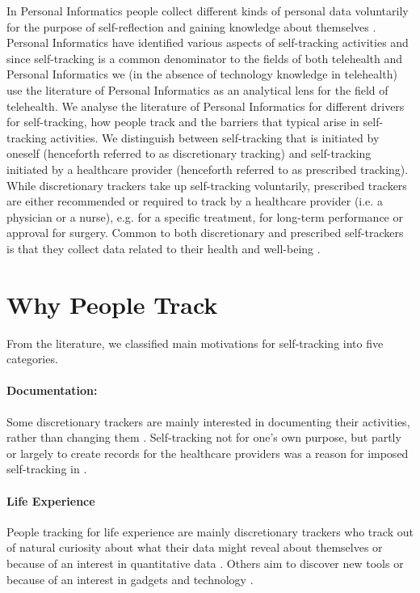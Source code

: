 In Personal Informatics people collect different kinds of personal data voluntarily for the purpose of self-reflection and gaining knowledge about themselves \cite{Li2010}.  Personal Informatics have identified various aspects of self-tracking activities \cite{Li2010} and since self-tracking is a common denominator to the fields of both telehealth and Personal Informatics we (in the absence of technology knowledge in telehealth) use the literature of Personal Informatics as an analytical lens for the field of telehealth. We analyse the literature of Personal Informatics for different drivers for self-tracking, how people track and the barriers that typical arise in self-tracking activities. We distinguish between self-tracking that is initiated by oneself (henceforth referred to as discretionary tracking) and self-tracking initiated by a healthcare provider (henceforth referred to as prescribed tracking). While discretionary trackers take up self-tracking voluntarily, prescribed trackers are either recommended or required to track by a healthcare provider (i.e. a physician or a nurse), e.g. for a specific treatment, for long-term performance or approval for surgery. Common to both discretionary and prescribed self-trackers is that they collect data related to their health and well-being \citep{Choe2014, MacLeod2014, Chung2016}.



\section{Why People Track} 
From the literature, we classified main motivations for self-tracking into five categories.

\paragraph{Documentation:}
Some discretionary trackers are mainly interested in documenting their activities, rather than changing them \citep{Rooksby2014}. Self-tracking not for one's own purpose, but partly or largely to create records for the healthcare providers was a reason for imposed self-tracking in \citep{Ancker2015}. 

\paragraph{Life Experience} 
People tracking for life experience are mainly discretionary trackers who track out of natural curiosity about what their data might reveal about themselves \citep{Li2010, Epstein2015} or because of an interest in quantitative data \citep{Li2010, Rooksby2014}. Others aim to discover new tools or because of an interest in gadgets and technology \citep{Li2010, Rooksby2014}. 

